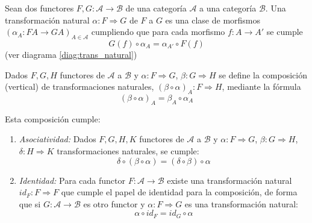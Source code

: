 \begin{definicion}
    Sean dos functores $F,G: \mathscr{A} \longrightarrow \mathscr{B}$ de una categoría $\mathscr{A}$ a una categoría $\mathscr{B}$. Una transformación natural $\alpha: F \Rightarrow G$ de $F$ a $G$ es una clase de morfismos $(\alpha_A:FA \longrightarrow GA)_{A\in \mathscr{A}}$ cumpliendo que para cada morfismo $f: A \longrightarrow A'$ se cumple \begin{equation}
        G(f) \circ \alpha_{A} = \alpha_{A'} \circ F(f)
    \end{equation}
    (ver diagrama \ref{diag:trans_natural})
    \label{t_natural}
\end{definicion}

\begin{figure}[htpb]
    \centering
\end{figure}

\begin{definicion}
        Dados $F,G,H$ functores de $\mathscr{A}$ a $\mathscr{B}$ y $\alpha: F \Rightarrow G$, $\beta: G \Rightarrow H$ se define la composición (vertical) de transformaciones naturales, $(\beta \circ \alpha)_{A}: F \Rightarrow H$, mediante la fórmula \begin{equation}
        (\beta \circ \alpha)_{A} = \beta_{A} \circ \alpha_{A}
    \end{equation}
    
    Esta composición cumple:
    
    \begin{enumerate}
        \item \textit{Asociatividad: } Dados $F,G,H, K$ functores de $\mathscr{A}$ a $\mathscr{B}$ y $\alpha: F \Rightarrow G$, $\beta: G \Rightarrow H$, $\delta: H \Rightarrow K$ transformaciones naturales, se cumple: \begin{equation}
            \delta \circ (\beta \circ \alpha) = (\delta \circ \beta) \circ \alpha
        \end{equation} 
        \item \textit{Identidad: }  Para cada functor $F: \mathscr{A} \longrightarrow \mathscr{B}$ existe una transformación natural $id_{F}: F \Rightarrow F$ que cumple el papel de identidad para la composición, de forma que si $G: \mathscr{A} \longrightarrow \mathscr{B}$ es otro functor y $\alpha: F \Rightarrow G$ es una transformación natural: \begin{equation}
            \alpha \circ id_{F} = id_{G} \circ \alpha
        \end{equation}
    \end{enumerate}
\end{definicion}

